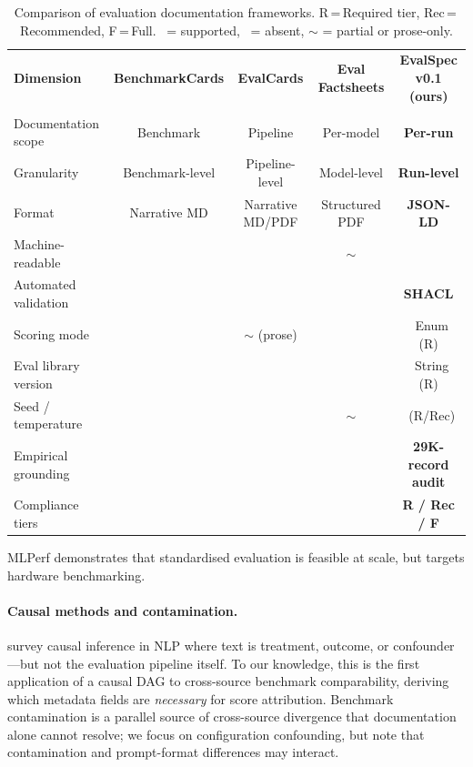 \documentclass[11pt]{article}
\newcommand{\cmark}{\ding{51}}
\newcommand{\xmark}{\ding{55}}
\begin{document}
\begin{table}[t]
\centering
\small
\setlength{\tabcolsep}{4pt}
\caption{Comparison of evaluation documentation frameworks.
  R\,=\,Required tier, Rec\,=\,Recommended, F\,=\,Full.
  \cmark\ = supported, \xmark\ = absent, $\sim$ = partial or prose-only.}
\label{tab:framework-comparison}
\begin{tabular}{@{}l cccc@{}}
\toprule
\textbf{Dimension}
  & \textbf{BenchmarkCards}
  & \textbf{EvalCards}
  & \textbf{Eval Factsheets}
  & \textbf{EvalSpec v0.1 (ours)} \\
  & \citep{sokol2025benchmarkcards}
  & \citep{dhar2025evalcards}
  & \citep{bordes2025factsheets}
  & \\
\midrule
Documentation scope
  & Benchmark & Pipeline & Per-model & \textbf{Per-run} \\
Granularity
  & Benchmark-level & Pipeline-level & Model-level & \textbf{Run-level} \\
Format
  & Narrative MD & Narrative MD/PDF & Structured PDF & \textbf{JSON-LD} \\
Machine-readable
  & \xmark & \xmark & $\sim$ & \cmark \\
Automated validation
  & \xmark & \xmark & \xmark & \textbf{SHACL} \\
\addlinespace
Scoring mode
  & \xmark & $\sim$ (prose) & \xmark & \cmark\ Enum (R) \\
Eval library version
  & \xmark & \xmark & \xmark & \cmark\ String (R) \\
Seed / temperature
  & \xmark & \xmark & $\sim$ & \cmark\ (R/Rec) \\
\addlinespace
Empirical grounding
  & \xmark & \xmark & \xmark & \textbf{29K-record audit} \\
Compliance tiers
  & \xmark & \xmark & \xmark & \textbf{R / Rec / F} \\
\bottomrule
\end{tabular}
\end{table}
MLPerf \citep{mattson-2020-mlperf} demonstrates that standardised
evaluation is feasible at scale, but targets hardware benchmarking.

\paragraph{Causal methods and contamination.}
\citet{feder2022causal} survey causal inference in NLP where text
is treatment, outcome, or confounder---but not the evaluation
pipeline itself. To our knowledge, this is the first application of
a causal DAG to cross-source benchmark comparability, deriving
which metadata fields are \emph{necessary} for score attribution.
Benchmark contamination \citep{sainz-2023-contamination} is a
parallel source of cross-source divergence that documentation
alone cannot resolve; we focus on configuration confounding, but
note that contamination and prompt-format differences may
interact.
\end{document}
